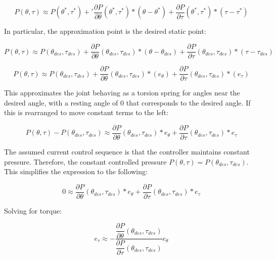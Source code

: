 \documentclass[12pt, letterpaper, oneside, notitlepage, onecolumn]{article}
\begin{document}
\begin{equation}
P(\theta, \tau) \approx P(\theta^{*}, \tau^{*}) + '
\dfrac{\partial P}{\partial \theta}(\theta^{*}, \tau^{*}) * (\theta -\theta^{*}) +
\dfrac{\partial P}{\partial \tau}(\theta^{*}, \tau^{*}) * (\tau - \tau^{*})
\end{equation}

In particular, the approximation point is the desired static point:

\begin{equation}
P(\theta, \tau) \approx P(\theta_{des}, \tau_{des}) + 
\dfrac{\partial P}{\partial \theta}(\theta_{des}, \tau_{des}) * (\theta -\theta_{des}) +
\dfrac{\partial P}{\partial \tau}(\theta_{des}, \tau_{des}) * (\tau - \tau_{des})
\end{equation}

\begin{equation}
P(\theta, \tau) \approx P(\theta_{des}, \tau_{des}) + 
\dfrac{\partial P}{\partial \theta}(\theta_{des}, \tau_{des}) * (e_{\theta}) +
\dfrac{\partial P}{\partial \tau}(\theta_{des}, \tau_{des}) * (e_{\tau})
\end{equation}

This approximates the joint behaving as a torsion spring for angles near the
desired angle, with a resting angle of 0 that corresponds to the desired angle.
If this is rearranged to move constant terms to the left:

\begin{equation}
P(\theta, \tau) - P(\theta_{des}, \tau_{des})
\approx
\dfrac{\partial P}{\partial \theta}(\theta_{des}, \tau_{des}) * e_{\theta}
+ \dfrac{\partial P}{\partial \tau}(\theta_{des}, \tau_{des}) * e_{\tau}
\end{equation}

The assumed current control sequence is that the controller maintains constant
pressure. Therefore, the constant controlled pressure $P(\theta, \tau) = 
P(\theta_{des}, \tau_{des})$. This simplifies the expression to the following:

\begin{equation}
0
\approx
\dfrac{\partial P}{\partial \theta}(\theta_{des}, \tau_{des}) * e_{\theta}
+ \dfrac{\partial P}{\partial \tau}(\theta_{des}, \tau_{des}) * e_{\tau}
\end{equation}

Solving for torque:

\begin{equation}
e_{\tau}
\approx
- \dfrac{\dfrac{\partial P}{\partial \theta}(\theta_{des}, \tau_{des})}{
\dfrac{\partial P}{\partial \tau}(\theta_{des}, \tau_{des})}
e_{\theta}
\end{equation}
\end{document}
